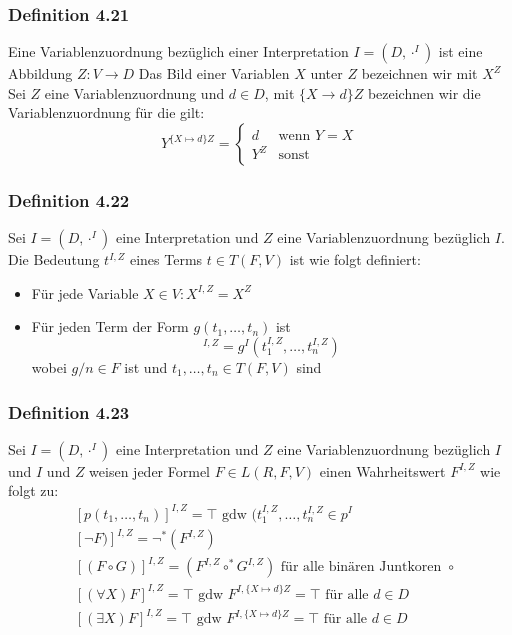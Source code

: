 \subsubsection{Definition 4.21}
Eine Variablenzuordnung bezüglich einer Interpretation \(I=(D,\cdot ^I)\) ist eine Abbildung \(Z: V\to D\) Das Bild einer Variablen \(X\) unter \(Z\) bezeichnen wir mit \(X^Z\) Sei \(Z\) eine Variablenzuordnung und \(d\in D\),  mit \(\{X \to d\}Z\) bezeichnen wir die Variablenzuordnung für die gilt:
\begin{displaymath}
	Y^{\{ X\mapsto d\}Z}  = \begin{cases}
		d &\text{wenn } Y = X \\
		Y^Z &\text{sonst }
		\end{cases}
\end{displaymath}
\subsubsection{Definition 4.22}
Sei \(I=(D,\cdot ^I)\) eine Interpretation und \(Z\) eine Variablenzuordnung bezüglich \(I\). Die Bedeutung \(t^{I,Z}\) eines Terms \(t\in T(F,V)\) ist wie folgt definiert:
\begin{itemize}
	\item Für jede Variable \(X\in V: X^{I,Z} = X^Z\)
	\item Für jeden Term der Form \(g(t_{1}, \ldots, t_{n})\) ist
	\begin{displaymath}
		[g(t_{1}, \ldots, t_{n})]^{I,Z}=g^I(t_{1}^{I,Z},\ldots,t_n^{I,Z})
	\end{displaymath}
	wobei \(g/n\in F\) ist und \(t_1, \ldots, t_n \in T(F,V)\) sind
\end{itemize}
\subsubsection{Definition 4.23}
Sei \(I=(D,\cdot ^I)\) eine Interpretation und \(Z\) eine Variablenzuordnung bezüglich \(I\) und \(I\) und \(Z\) weisen jeder Formel \(F\in L(R,F,V)\) einen Wahrheitswert \(F^{I,Z} \) wie folgt zu: 
\begin{align*}
&[p(t_1,\ldots ,t_n)]^{I,Z} =  \top \text{ gdw } (t_1^{I,Z},\ldots ,t_n^{I,Z} \in p^I \\ &[\neg F )]^{I,Z} = \neg^*(F^{I,Z}) \\
&[(F\circ G)]^{I,Z} = (F^{I,Z}\circ^* G^{I,Z}) \text{ für alle binären Juntkoren }\circ \\
&[(\forall X)F]^{I,Z}=\top \text{ gdw } F^{I,\{X \mapsto d\}Z} = \top \text{ für alle } d \in D \\
&[(\exists X)F]^{I,Z}=\top \text{ gdw } F^{I,\{X \mapsto d\}Z} = \top \text{ für alle } d \in D \\
\end{align*}
